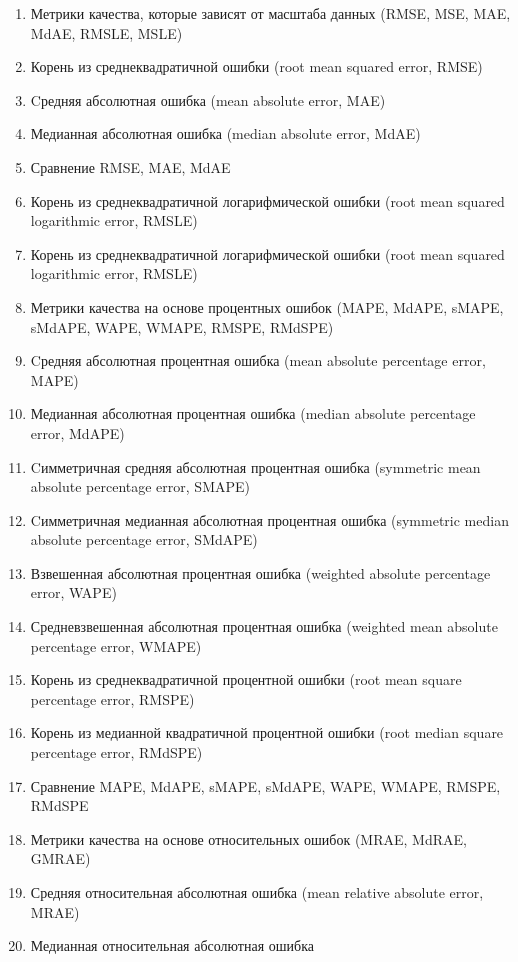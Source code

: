 \begin{enumerate}
  \item Метрики качества, которые зависят от масштаба данных
    (RMSE, MSE, MAE, MdAE, RMSLE, MSLE)
  \item Корень из среднеквадратичной ошибки (root mean squared error, RMSE)
  \item Cредняя абсолютная ошибка (mean absolute error, MAE)
  \item Медианная абсолютная ошибка (median absolute error, MdAE)
  \item Сравнение RMSE, MAE, MdAE
  \item Корень из среднеквадратичной логарифмической ошибки
    (root mean squared logarithmic error, RMSLE)
  \item Корень из среднеквадратичной логарифмической ошибки
    (root mean squared logarithmic error, RMSLE)
  \item Метрики качества на основе процентных ошибок
    (MAPE, MdAPE, sMAPE, sMdAPE, WAPE, WMAPE, RMSPE, RMdSPE)
  \item Cредняя абсолютная процентная ошибка
    (mean absolute percentage error, MAPE)
  \item Медианная абсолютная процентная ошибка
    (median absolute percentage error, MdAPE)
  \item Cимметричная средняя абсолютная процентная ошибка
    (symmetric mean absolute percentage error, SMAPE)
  \item Cимметричная медианная абсолютная процентная ошибка
    (symmetric median absolute percentage error, SMdAPE)
  \item Взвешенная абсолютная процентная ошибка
    (weighted absolute percentage error, WAPE)
  \item Средневзвешенная абсолютная процентная ошибка
    (weighted mean absolute percentage error, WMAPE)
  \item Корень из среднеквадратичной процентной ошибки
    (root mean square percentage error, RMSPE)
  \item Корень из медианной квадратичной процентной ошибки
    (root median square percentage error, RMdSPE)
  \item Сравнение MAPE, MdAPE, sMAPE, sMdAPE, WAPE, WMAPE,
    RMSPE, RMdSPE
  \item Метрики качества на основе относительных ошибок
    (MRAE, MdRAE, GMRAE)
  \item Средняя относительная абсолютная ошибка
    (mean relative absolute error, MRAE)
  \item Медианная относительная абсолютная ошибка

\end{enumerate}
